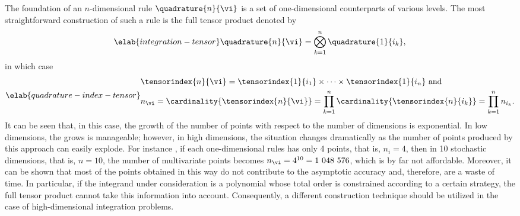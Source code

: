 The foundation of an $n$-dimensional rule $\quadrature{n}{\vi}$ is a set of
one-dimensional counterparts of various levels. The most straightforward
construction of such a rule is the full tensor product denoted by
\begin{equation} \elab{integration-tensor}
  \quadrature{n}{\vi} = \bigotimes_{k = 1}^n \quadrature{1}{i_k},
\end{equation}
in which case
\begin{equation} \elab{quadrature-index-tensor}
  \begin{split}
    & \tensorindex{n}{\vi}
    = \tensorindex{1}{i_1} \times \cdots \times \tensorindex{1}{i_n} \text{ and} \\
    & n_{\vi}
    = \cardinality{\tensorindex{n}{\vi}}
    = \prod_{k = 1}^n \cardinality{\tensorindex{n}{i_k}}
    = \prod_{k = 1}^n n_{i_k}.
  \end{split}
\end{equation}
It can be seen that, in this case, the growth of the number of points with
respect to the number of dimensions is exponential. In low dimensions, the grows
is manageable; however, in high dimensions, the situation changes dramatically
as the number of points produced by this approach can easily explode. For
instance \cite{heiss2008}, if each one-dimensional rules has only 4 points, that
is, $n_i = 4$, then in 10 stochastic dimensions, that is, $n = 10$, the number
of multivariate points becomes $n_{\vi} = 4^{10} = 1~048~576$, which is by far
not affordable. Moreover, it can be shown that most of the points obtained in
this way do not contribute to the asymptotic accuracy and, therefore, are a
waste of time. In particular, if the integrand under consideration is a
polynomial whose total order is constrained according to a certain strategy, the
full tensor product cannot take this information into account. Consequently, a
different construction technique should be utilized in the case of
high-dimensional integration problems.

